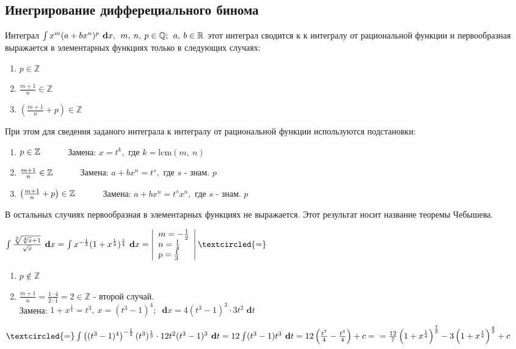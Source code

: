 \documentclass[a4paper,12pt, centered]{bookest}
\theoremstyle{remark}
\newcommand\tab[1][1cm]{\hspace*{#1}}
\newcommand\dx{\textbf{ d}x}
\newcommand\dy{\textbf{ d}}
\newcommand\lcm{\textrm{lcm}}
\begin{document}
\subsection{Инегрирование дифферециального бинома}
Интеграл $\int x^m(a+bx^n)^p\dx,\>\>m,\>n,\>p\in\mathbb{Q};\>\>a,\>b\in\mathbb{R}\\$ этот интеграл сводится к к интегралу от рациональной функции и первообразная выражается в элементарных функциях только в следующих случаях: \begin{enumerate}
	\item $p\in\mathbb{Z}$
	\item $\frac{m+1}{n}\in\mathbb{Z}$
	\item $\left(\frac{m+1}{n}+p\right)\in\mathbb{Z}$ 
\end{enumerate}   
При этом для сведения заданого интеграла к интегралу от рациональной функции используются подстановки: \begin{enumerate}
	\item $p\in\mathbb{Z}\tab $ Замена: $x=t^k,$ где $k=\lcm(m,\>n)$
	\item $\frac{m+1}{n}\in\mathbb{Z}\tab $ Замена: $a+bx^n=t^s,$ где $s$ - знам. $p$
	\item $\left(\frac{m+1}{n}+p\right)\in\mathbb{Z}\tab $ Замена: $a+bx^n=t^sx^n,$ где $s$ - знам. $p$
\end{enumerate}
В остальных случиях первообразная в элементарных функциях не выражается. Этот результат носит название теоремы Чебышева. 
\begin{example}
	$\int\frac{\sqrt[3]{\sqrt[4]{x}+1}}{\sqrt x}\dx=\int x^{-\frac12}(1+x^{\frac14})^{\frac14 }\dx=\left|\begin{array}{l}
		m=-\frac12\\n=\frac14\\p=\frac13
	\end{array}\right|\textcircled{=}$\begin{enumerate}
		\item $p\not\in\mathbb{Z}$
		\item $\frac{m+1}{n}=\frac{1\cdot 4}{2\cdot 1}=2\in\mathbb{Z}$ - второй случай. \\ Замена: $1+x^{\frac14}=t^3,\>x=(t^3-1)^4;\>\dx=4(t^3-1)^3\cdot3t^2\dy t$
	\end{enumerate}
	$\textcircled{=}\int\left((t^3-1)^4\right)^{-\frac12}(t^3)^{\frac13}\cdot 12t^2(t^3-1)^3\dy t=12\int(t^3-1)t^3\dy t=12\left(\frac{t^7}4-\frac{t^4}4\right)+c=\\=\frac{12}7\left(1+x^{\frac14}\right)^{\frac73}-3\left(1+x^{\frac14}\right)^{\frac43}+c$
\end{example}
\end{document}
